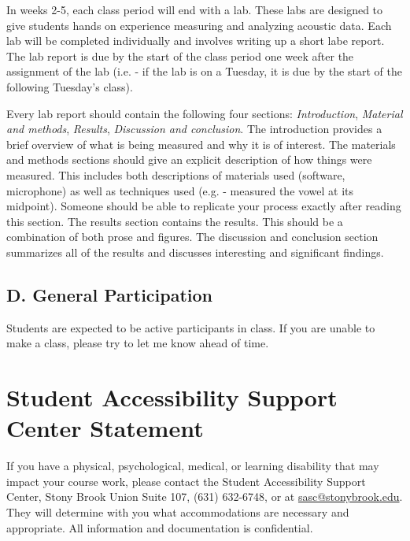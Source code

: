 \documentclass[11pt]{article}
\begin{document}
In weeks 2-5, each class period will end with a lab.
These labs are designed to give students hands on experience measuring and analyzing acoustic data. 
Each lab will be completed individually and involves writing up a short labe report.
The lab report is due by the start of the class period one week after the assignment of the lab (i.e. - if the lab is on a Tuesday, it is due by the start of the following Tuesday's class).

Every lab report should contain the following four sections: \textit{Introduction}, \textit{Material and methods}, \textit{Results}, \textit{Discussion and conclusion}. 
The introduction provides a brief overview of what is being measured and why it is of interest. 
The materials and methods sections should give an explicit description of how things were measured.
This includes both descriptions of materials used (software, microphone) as well as techniques used (e.g. - measured the vowel at its midpoint).
Someone should be able to replicate your process exactly after reading this section.
The results section contains the results.
This should be a combination of both prose and figures.
The discussion and conclusion section summarizes all of the results and discusses interesting and significant findings.

\subsection*{D. General Participation}

Students are expected to be active participants in class.
If you are unable to make a class, please try to let me know ahead of time.


\section*{Student Accessibility Support Center Statement}

If you have a physical, psychological, medical, or learning disability that may impact your course work, please contact the Student Accessibility Support Center, Stony Brook Union Suite 107, (631) 632-6748, or at \href{mailto:sasc@stonybrook.edu}{sasc@stonybrook.edu}. They will determine with you what accommodations are necessary and appropriate. All information and documentation is confidential.

\end{document}
